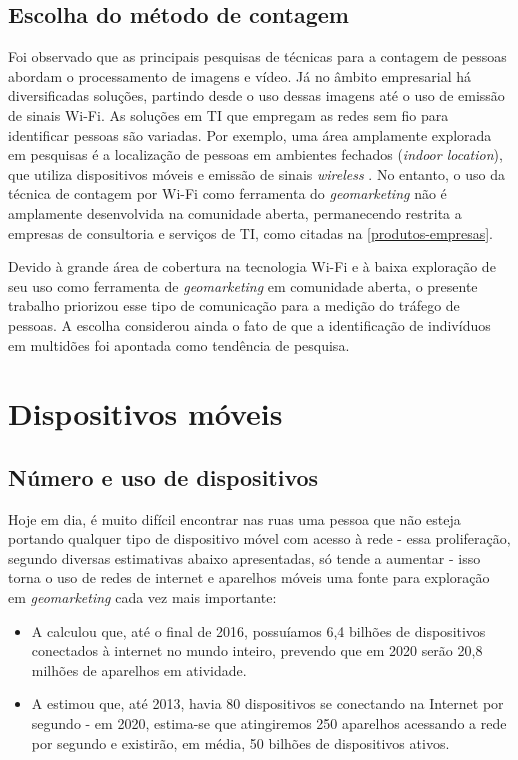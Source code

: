 \subsection{Escolha do método de contagem}
Foi observado que as principais pesquisas de técnicas para a contagem de pessoas abordam o processamento de imagens e vídeo. Já no âmbito empresarial
há diversificadas soluções, partindo desde o uso dessas imagens até o uso de emissão de sinais Wi-Fi.
As soluções em TI que empregam as redes sem fio para identificar pessoas são variadas. Por exemplo,
uma área amplamente explorada em pesquisas é a localização de pessoas em
ambientes fechados (\emph{indoor location}), que utiliza dispositivos móveis e emissão de sinais \emph{wireless} \cite{Ferreira2016}
\cite{Puhl2016} \cite{Figuera2011}. No entanto, o uso da técnica de contagem por Wi-Fi como ferramenta do \emph{geomarketing} não é amplamente desenvolvida na comunidade aberta, permanecendo restrita a empresas de consultoria e serviços de TI, como citadas na \autoref{produtos-empresas}.

Devido à grande área de cobertura na tecnologia Wi-Fi e à baixa exploração de seu uso como ferramenta de \emph{geomarketing} em comunidade aberta, o presente trabalho priorizou esse tipo de comunicação para a medição do tráfego de pessoas. A escolha considerou ainda o fato de que a identificação de indivíduos em multidões foi apontada como tendência de pesquisa.


\section{Dispositivos móveis}

\subsection{Número e uso de dispositivos}

Hoje em dia, é muito difícil encontrar nas ruas uma pessoa que não esteja portando qualquer tipo de dispositivo móvel com acesso à rede - essa proliferação, segundo diversas estimativas abaixo apresentadas, só tende a aumentar - isso torna o uso de redes de internet e aparelhos móveis uma fonte para exploração em \emph{geomarketing} cada vez mais importante:
\begin{itemize}
\item A  calculou que, até o final de 2016, possuíamos 6,4 bilhões de dispositivos conectados à internet no mundo inteiro, prevendo que em 2020 serão 20,8 milhões de aparelhos em atividade.
\item A  estimou que, até 2013, havia 80 dispositivos se conectando na Internet por segundo - em 2020, estima-se que atingiremos 250 aparelhos acessando a rede por segundo e existirão, em média, 50 bilhões de dispositivos ativos.
\end{itemize}

